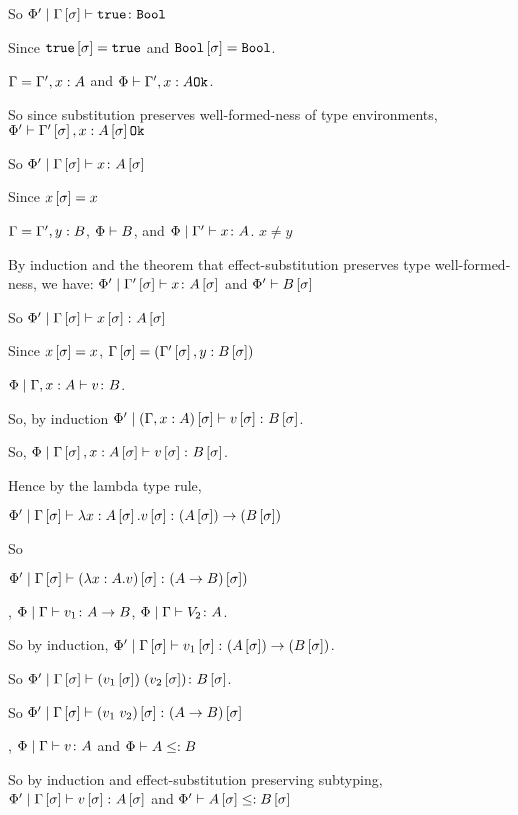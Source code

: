 {    So $\etyperelation{\P'}{\G\ssi}{\t}{\B}$

    Since $\t\ssi=\t$ and $\B\ssi=\B$.
   
    \bi $\G = \G', x:A$ and $\wellformedok{\P}{\G', x:A}$.

    So since substitution preserves well-formed-ness of type environments, $\wellformedok{\P'}{\G'\ssi, x:A\ssi}$

    So $\etyperelation{\P'}{\G\ssi}{x}{A\ssi}$

    Since $x\ssi = x$

    \bi $\G = \G', y:B$, $\wellformed{\P}{B}$, and $\etyperelation{\P}{\G'}{x}{A}$. $x \neq y$

    By induction and the theorem that effect-substitution preserves type well-formed-ness, we have: $\etyperelation{\P'}{\G'\ssi}{x}{A\ssi}$ and $\wellformed{\P'}{B\ssi}$

    So $\etyperelation{\P'}{\G\ssi}{x\ssi}{A\ssi}$

    Since $x\ssi = x$, $\G\ssi = (\G'\ssi, y:B\ssi)$

    
    \bi $\etyperelation{\P}{\gax}{v}{B}$.

    So, by induction $\etyperelation{\P'}{(\gax)\ssi}{v\ssi}{B\ssi}$.

    So, $\etyperelation{\P}{\G\ssi, x:A\ssi}{v\ssi}{B\ssi}$.

    Hence by the lambda type rule,

    $\etyperelation{\P'}{\G\ssi}{\lam{x}{A\ssi}{v\ssi}}{\fntype{(A\ssi)}{(B\ssi)}}$

    So
    
    $\etyperelation{\P'}{\G\ssi}{(\lam{x}{A}{v})\ssi}{(\ab)\ssi)}$

    \bi, $\gpetyperelation{v_1}{\ab}$, $\gpetyperelation{V_2}{A}$.

    So by induction, $\etyperelation{\P'}{\G\ssi}{v_1\ssi}{\fntype{(A\ssi)}{(B\ssi)}}$.

    So $\etyperelation{\P'}{\G\ssi}{\apply{(v_1\ssi)}{(v_2\ssi)}}{B\ssi}$.

    So $\etyperelation{\P'}{\G\ssi}{(\apply{v_1}{v_2})\ssi}{(\ab)\ssi}$

    \bi, $\gpetyperelation{v}{A}$ and $\wellformed{\P}{A\subtype B}$

    So by induction and effect-substitution preserving subtyping, $\etyperelation{\P'}{\G\ssi}{v\ssi}{A\ssi}$ and $\wellformed{\P'}{A\ssi\subtype B\ssi}$

}
